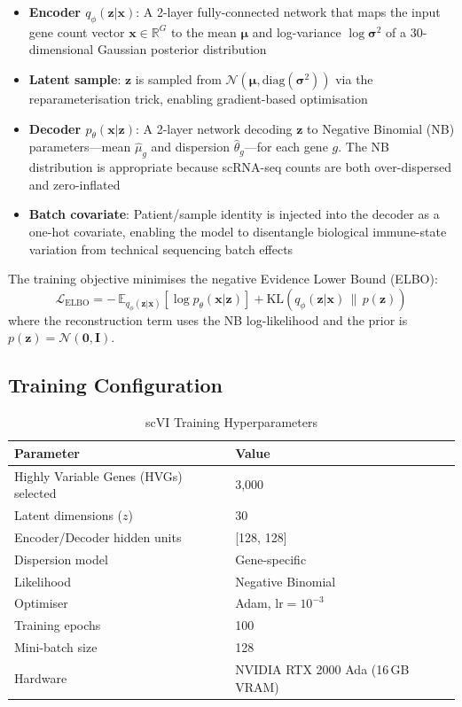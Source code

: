 \begin{itemize}
    \item \textbf{Encoder $q_\phi(\mathbf{z} | \mathbf{x})$}: A 2-layer fully-connected network that maps the input gene count vector $\mathbf{x} \in \mathbb{R}^{G}$ to the mean $\boldsymbol{\mu}$ and log-variance $\log\boldsymbol{\sigma}^2$ of a 30-dimensional Gaussian posterior distribution
    \item \textbf{Latent sample}: $\mathbf{z}$ is sampled from $\mathcal{N}(\boldsymbol{\mu}, \text{diag}(\boldsymbol{\sigma}^2))$ via the reparameterisation trick, enabling gradient-based optimisation
    \item \textbf{Decoder $p_\theta(\mathbf{x} | \mathbf{z})$}: A 2-layer network decoding $\mathbf{z}$ to Negative Binomial (NB) parameters---mean $\hat{\mu}_g$ and dispersion $\hat{\theta}_g$---for each gene $g$. The NB distribution is appropriate because scRNA-seq counts are both over-dispersed and zero-inflated
    \item \textbf{Batch covariate}: Patient/sample identity is injected into the decoder as a one-hot covariate, enabling the model to disentangle biological immune-state variation from technical sequencing batch effects
\end{itemize}



The training objective minimises the negative Evidence Lower Bound (ELBO):
\begin{equation}
    \mathcal{L}_{\text{ELBO}} = -\,\mathbb{E}_{q_\phi(\mathbf{z}|\mathbf{x})}\!\left[\log p_\theta(\mathbf{x}|\mathbf{z})\right] + \mathrm{KL}\!\left(q_\phi(\mathbf{z}|\mathbf{x}) \,\big\|\, p(\mathbf{z})\right)
    \label{eq:elbo}
\end{equation}
where the reconstruction term uses the NB log-likelihood and the prior is $p(\mathbf{z}) = \mathcal{N}(\mathbf{0}, \mathbf{I})$.

\subsection{Training Configuration}

\begin{table}[ht]
\centering
\caption{scVI Training Hyperparameters}
\label{tab:scvi_config}
\begin{tabular}{ll}
\toprule
\textbf{Parameter} & \textbf{Value} \\
\midrule
Highly Variable Genes (HVGs) selected & 3,000 \\
Latent dimensions ($z$) & 30 \\
Encoder/Decoder hidden units & [128, 128] \\
Dispersion model & Gene-specific \\
Likelihood & Negative Binomial \\
Optimiser & Adam, $\text{lr} = 10^{-3}$ \\
Training epochs & 100 \\
Mini-batch size & 128 \\
Hardware & NVIDIA RTX 2000 Ada (16\,GB VRAM) \\
\bottomrule
\end{tabular}
\end{table}

